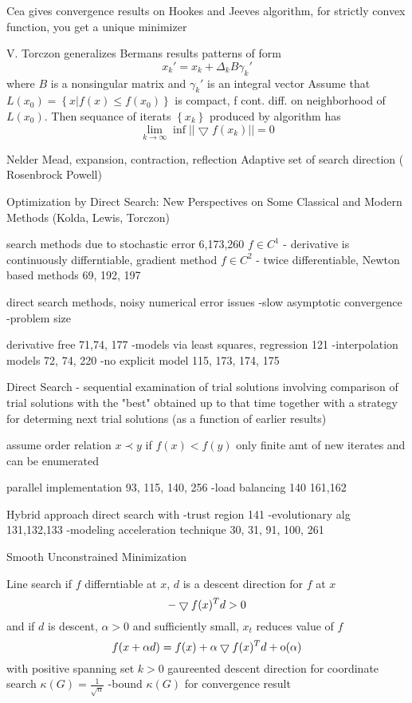 Cea gives convergence results on Hookes and Jeeves algorithm, for strictly convex function, you get a unique minimizer

V. Torczon generalizes Bermans results
patterns of form 
\begin{equation}
x_k' = x_k + \Delta_k B \gamma_k'
\end{equation}
where $B$ is a nonsingular matrix and $\gamma_k'$ is an integral vector
Assume that $L(x_0) = \left\{ x | f(x)  \le f(x_0) \right\} $ is compact, f cont. diff. on neighborhood of $L(x_0)$.  Then sequance of iterats $\left\{ x_k \right\}$ produced by algorithm has
\begin{equation}
\lim_{k \rightarrow \infty} \inf || \bigtriangledown f (x_k) || = 0
\end{equation}


Nelder Mead, expansion, contraction, reflection
Adaptive set of search direction ( Rosenbrock Powell)

Optimization by Direct Search: New Perspectives on Some Classical and Modern Methods (Kolda, Lewis, Torczon) \cite{kolda_2003}


search methods due to stochastic error 6,173,260
$f\in C^1$ - derivative is continuously differntiable, gradient method
$f \in C^2$ - twice differentiable, Newton based methods 69, 192, 197

direct search methods, noisy numerical error
issues
-slow asymptotic convergence
-problem size

derivative free 71,74, 177
-models via least squares, regression 121
-interpolation models 72, 74, 220
-no explicit model 115, 173, 174, 175

Direct Search - sequential examination of trial solutions involving comparison of trial solutions with the "best" obtained up to that time together with a strategy for determing next trial solutions (as a function of earlier results)

assume order relation
$ x \prec y$ if $f(x) < f(y)$
only finite amt of new iterates and can be enumerated

parallel implementation 93, 115, 140, 256
-load balancing 140
161,162

Hybrid approach
direct search with
-trust region 141
-evolutionary alg 131,132,133
-modeling acceleration technique 30, 31, 91, 100, 261

Smooth Unconstrained Minimization

Line search
if $f$ differntiable at $x$, $d$ is a descent direction for $f$ at $x$ 
\begin{equation}
- \bigtriangledown f(x)^T d > 0
\end{equation}
and if $d$ is descent, $\alpha >0$ and sufficiently small, $x_t$ reduces value of $f$
\begin{equation}
f(x + \alpha d) = f(x) + \alpha \bigtriangledown f(x)^T d + \mbox{o}(\alpha)
\end{equation}
with positive spanning set $k>0$
gaureented descent direction
for coordinate search $\kappa (G) = \frac{1}{\sqrt{n}}$
-bound $\kappa (G)$ for convergence result

